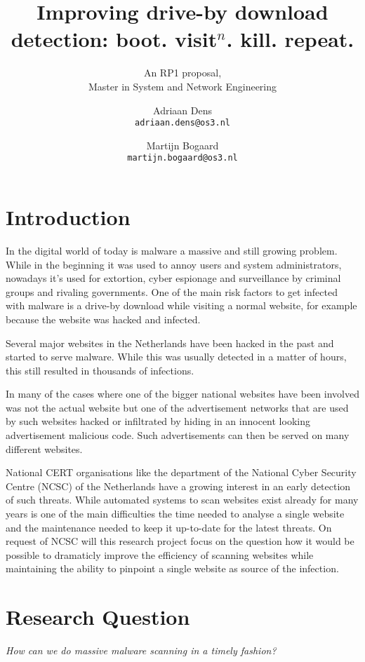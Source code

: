 \documentclass{scrartcl}
\title{Improving drive-by download detection: boot. visit$^n$. kill. repeat.}
\subtitle{An RP1 proposal,\\Master in System and Network Engineering}
\author{
  Adriaan Dens\\
   \texttt{adriaan.dens@os3.nl}
  \and
  Martijn Bogaard\\
   \texttt{martijn.bogaard@os3.nl}
}
\begin{document}
\maketitle

\section{Introduction}

In the digital world of today is malware a massive and still growing problem. While in the beginning it was used to annoy users and system administrators, nowadays it's used for extortion, cyber espionage and surveillance by criminal groups and rivaling governments. One of the main risk factors to get infected with malware is a drive-by download while visiting a normal website, for example because the website was hacked and infected. 

Several major websites in the Netherlands have been hacked in the past and started to serve malware. While this was usually detected in a matter of hours, this still resulted in thousands of infections.

In many of the cases where one of the bigger national websites have been involved was not the actual website but one of the advertisement networks that are used by such websites hacked or infiltrated by hiding in an innocent looking advertisement malicious code. Such advertisements can then be served on many different websites.

National CERT organisations like the department of the National Cyber Security Centre (NCSC) of the Netherlands have a growing interest in an early detection of such threats. While automated systems to scan websites exist already for many years is one of the main difficulties the time needed to analyse a single website and the maintenance needed to keep it up-to-date for the latest threats. On request of NCSC will this research project focus on the question how it would be possible to dramaticly improve the efficiency of scanning websites while maintaining the ability to pinpoint a single website as source of the infection.

\section{Research Question}

\textit{How can we do massive malware scanning in a timely fashion?}



\end{document}
